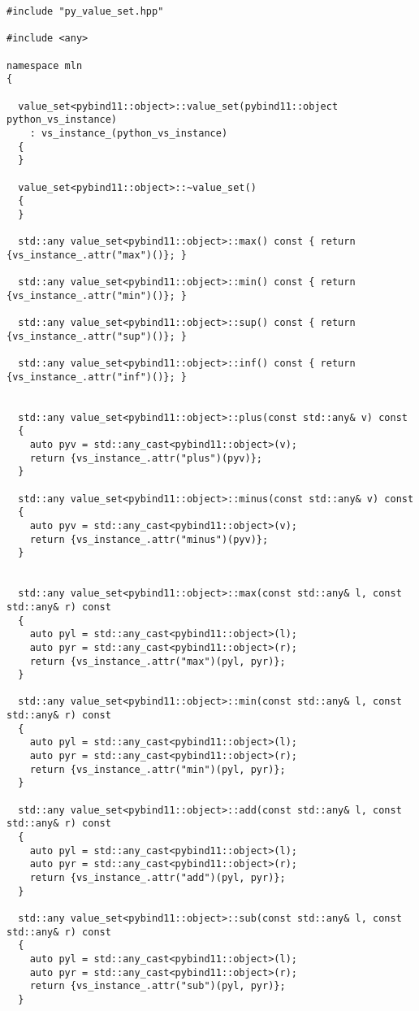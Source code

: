 \begin{verbatim}
#include "py_value_set.hpp"

#include <any>

namespace mln
{

  value_set<pybind11::object>::value_set(pybind11::object python_vs_instance)
    : vs_instance_(python_vs_instance)
  {
  }

  value_set<pybind11::object>::~value_set()
  {
  }

  std::any value_set<pybind11::object>::max() const { return {vs_instance_.attr("max")()}; }

  std::any value_set<pybind11::object>::min() const { return {vs_instance_.attr("min")()}; }

  std::any value_set<pybind11::object>::sup() const { return {vs_instance_.attr("sup")()}; }

  std::any value_set<pybind11::object>::inf() const { return {vs_instance_.attr("inf")()}; }


  std::any value_set<pybind11::object>::plus(const std::any& v) const
  {
    auto pyv = std::any_cast<pybind11::object>(v);
    return {vs_instance_.attr("plus")(pyv)};
  }

  std::any value_set<pybind11::object>::minus(const std::any& v) const
  {
    auto pyv = std::any_cast<pybind11::object>(v);
    return {vs_instance_.attr("minus")(pyv)};
  }


  std::any value_set<pybind11::object>::max(const std::any& l, const std::any& r) const
  {
    auto pyl = std::any_cast<pybind11::object>(l);
    auto pyr = std::any_cast<pybind11::object>(r);
    return {vs_instance_.attr("max")(pyl, pyr)};
  }

  std::any value_set<pybind11::object>::min(const std::any& l, const std::any& r) const
  {
    auto pyl = std::any_cast<pybind11::object>(l);
    auto pyr = std::any_cast<pybind11::object>(r);
    return {vs_instance_.attr("min")(pyl, pyr)};
  }

  std::any value_set<pybind11::object>::add(const std::any& l, const std::any& r) const
  {
    auto pyl = std::any_cast<pybind11::object>(l);
    auto pyr = std::any_cast<pybind11::object>(r);
    return {vs_instance_.attr("add")(pyl, pyr)};
  }

  std::any value_set<pybind11::object>::sub(const std::any& l, const std::any& r) const
  {
    auto pyl = std::any_cast<pybind11::object>(l);
    auto pyr = std::any_cast<pybind11::object>(r);
    return {vs_instance_.attr("sub")(pyl, pyr)};
  }


\end{verbatim}
